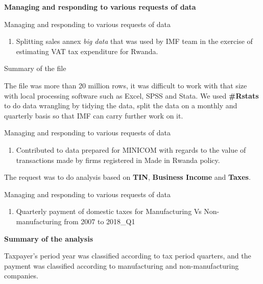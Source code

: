 \documentclass[ignorenonframetext,]{beamer}
\providecommand{\tightlist}{%
  \setlength{\itemsep}{0pt}\setlength{\parskip}{0pt}}
\begin{document}
\begin{frame}{}

\begin{center}
\textbf{Managing and responding to various requests of data}
\end{center}

\end{frame}

\begin{frame}{Managing and responding to various requests of data}

\begin{enumerate}
\def\labelenumi{\arabic{enumi}.}
\tightlist
\item
  Splitting sales annex \textit{big data} that was used by IMF team in
  the exercise of estimating VAT tax expenditure for Rwanda.
\end{enumerate}

\begin{block}{Summary of the file}

The file was more than 20 million rows, it was difficult to work with
that size with local processing software such as Excel, SPSS and Stata.
We used \textbf{\#Rstats} to do data wrangling by tidying the data,
split the data on a monthly and quarterly basis so that IMF can carry
further work on it.

\end{block}

\end{frame}

\begin{frame}{Managing and responding to various requests of data}

\begin{enumerate}
\def\labelenumi{\arabic{enumi}.}
\setcounter{enumi}{1}
\tightlist
\item
  Contributed to data prepared for MINICOM with regards to the value of
  transactions made by firms registered in Made in Rwanda policy.
\end{enumerate}

The request was to do analysis based on \textbf{TIN},
\textbf{Business Income} and \textbf{Taxes}.

\end{frame}

\begin{frame}{Managing and responding to various requests of data}

\begin{enumerate}
\def\labelenumi{\arabic{enumi})}
\setcounter{enumi}{2}
\tightlist
\item
  Quarterly payment of domestic taxes for Manufacturing Vs
  Non-manufacturing from 2007 to 2018\_Q1
\end{enumerate}

\textbf{Summary of the analysis}

Taxpayer's period year was classified according to tax period quarters,
and the payment was classified according to manufacturing and
non-manufacturing companies.

\end{frame}
\end{document}
